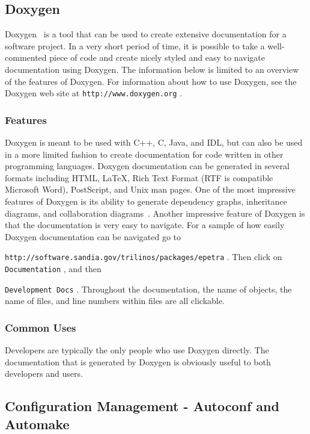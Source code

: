 \documentclass[12pt,relax]{article}
\newcommand{\InlineDirectory}[1]{
  {\hspace{0.01 in}} {\tt #1} {\hspace{0.01 in}}}
\begin{document}
\subsection{Doxygen}

Doxygen~\cite{Doxygen} is a tool that can be used to create 
extensive documentation for a software project.  In a very short period of 
time, it is possible to take a well-commented piece 
of code and create nicely styled and easy to navigate documentation using 
Doxygen.  The information below is limited 
to an overview of the features of Doxygen.  For information about how to use 
Doxygen, see the Doxygen 
web site at \InlineDirectory{http://www.doxygen.org}.  

\subsubsection{Features}

Doxygen is meant to be used with C++, C, Java, and IDL, but can also be used 
in a more limited fashion to create documentation for code written in other
programming languages.  Doxygen documentation 
can be generated in several formats including HTML, \LaTeX, Rich Text Format 
(RTF is compatible Microsoft Word), PostScript, and
Unix man pages.  One of the most impressive features of Doxygen is its ability 
to generate dependency graphs, inheritance diagrams, and collaboration 
diagrams~\cite{Doxygen}.  Another impressive feature of Doxygen is that the 
documentation is very easy to navigate.  For a sample of how easily Doxygen 
documentation can be navigated go to
\newline
\InlineDirectory{http://software.sandia.gov/trilinos/packages/epetra}.  Then
click on \InlineDirectory{Documentation}, and then 
\InlineDirectory{Development Docs}. 
Throughout the documentation, the name of objects, 
the name of files, and line numbers within files are all clickable.

\subsubsection{Common Uses}

Developers are typically the only people who use Doxygen directly.  
The documentation that is generated by Doxygen is obviously useful to both 
developers and users.

\subsection{Configuration Management - Autoconf and Automake}
\end{document}
